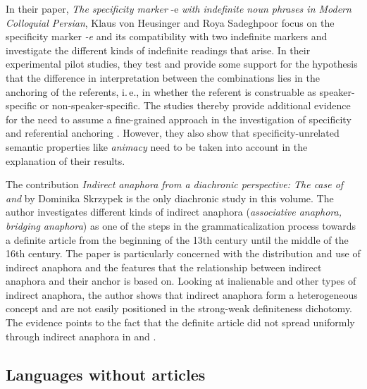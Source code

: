 \documentclass[output=paper]{langsci/langscibook}
\begin{document}
In their paper, {\emph{The specificity marker}} -e {\emph{with indefinite noun phrases in Modern Colloquial Persian}}, Klaus von Heusinger and Roya Sadeghpoor focus on the specificity marker {\emph{-e}} and its compatibility with two indefinite markers and investigate the different kinds of indefinite readings that arise. In their experimental pilot studies, they test  and provide some support for the hypothesis that the difference in interpretation between the combinations lies in the anchoring of the referents, i.\,e., in whether the referent is construable as speaker-specific or non-speaker-specific. The studies thereby provide additional evidence for the need to assume a fine-grained approach in the investigation of specificity and referential anchoring \citep{vonheus:02}. However, they also show that specificity-unrelated semantic properties like {\emph{animacy}} need to be taken into account in the explanation of their results.

The contribution {\emph{Indirect anaphora from a diachronic perspective: The case of  and }} by Dominika Skrzypek is the only diachronic study in this volume. The author investigates different kinds of indirect anaphora ({\emph{associative anaphora, bridging anaphora}}) as one of the steps in the grammaticalization process towards a definite article from the beginning of the 13th century until the middle of the 16th century. The paper is particularly concerned with the distribution and use of indirect anaphora and the features that the relationship between indirect anaphora and their anchor is based on. Looking at inalienable and other types of indirect anaphora, the author shows that indirect anaphora form a heterogeneous concept and are not easily positioned in the strong-weak definiteness dichotomy. The evidence points to the fact that the definite article did not spread uniformly through indirect anaphora in  and .

\subsection{Languages without articles}
\end{document}
